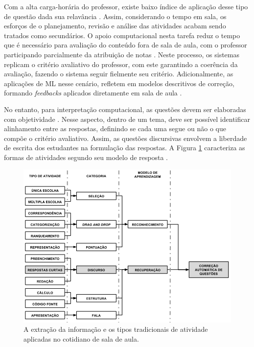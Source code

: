 Com a alta carga-horária do professor, existe baixo índice de aplicação desse tipo de questão dada sua relavância \cite{bilgin2017}. Assim, considerando o tempo em sala, os esforços de o planejamento, revisão e análise das atividades acabam sendo tratados como secundários. O apoio computacional nesta tarefa reduz o tempo que é necessário para avaliação do conteúdo fora de sala de aula, com o professor participando parcialmente da atribuição de notas \cite{ming2005}. Neste processo, os sistemas replicam o critério avaliativo do professor, com este garantindo a coerência da avaliação, fazendo o sistema seguir fielmente seu critério. Adicionalmente, as aplicações de ML nesse cenário, refletem em modelos descritivos de correção, formando \textit{feedbacks} aplicados diretamente em sala de aula \cite{butcher2010, bernius2022}. 

No entanto, para interpretação computacional, as questões devem ser elaboradas com objetividade \cite{bailey2008}. Nesse aspecto, dentro de um tema, deve ser possível identificar alinhamento entre as respostas, definindo se cada uma segue ou não o que compõe o critério avaliativo. Assim, as questões discursivas \cite{bezerra2008} envolvem a liberdade de escrita dos estudantes na formulação das respostas. A Figura \ref{fig-atividades} caracteriza as formas de atividades segundo seu modelo de resposta \cite{spalenza2017}.

\begin{figure}[!h]
\centering
\includegraphics[width=\textwidth]{figuras/tiposAtividade}
\caption{A extração da informação e os tipos tradicionais de atividade aplicadas no cotidiano de sala de aula.}
\label{fig-atividades}
\end{figure}

